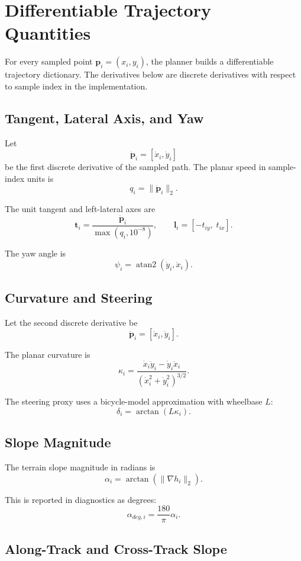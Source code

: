 \documentclass[11pt]{article}
\begin{document}
\section{Differentiable Trajectory Quantities}

For every sampled point \(\mathbf{p}_i=(x_i,y_i)\), the planner builds a differentiable trajectory dictionary. The derivatives below are discrete derivatives with respect to sample index in the implementation.

\subsection{Tangent, Lateral Axis, and Yaw}

Let
\[
  \dot{\mathbf{p}}_i = [\dot{x}_i,\dot{y}_i]
\]
be the first discrete derivative of the sampled path. The planar speed in sample-index units is
\[
  q_i = \|\dot{\mathbf{p}}_i\|_2.
\]

The unit tangent and left-lateral axes are
\[
  \mathbf{t}_i = \frac{\dot{\mathbf{p}}_i}{\max(q_i,10^{-8})},
  \qquad
  \mathbf{l}_i = [-t_{iy},\;t_{ix}].
\]

The yaw angle is
\[
  \psi_i = \operatorname{atan2}(\dot{y}_i,\dot{x}_i).
\]

\subsection{Curvature and Steering}

Let the second discrete derivative be
\[
  \ddot{\mathbf{p}}_i = [\ddot{x}_i,\ddot{y}_i].
\]

The planar curvature is
\[
  \kappa_i =
  \frac{\dot{x}_i\ddot{y}_i - \dot{y}_i\ddot{x}_i}
       {(\dot{x}_i^2+\dot{y}_i^2)^{3/2}}.
\]

The steering proxy uses a bicycle-model approximation with wheelbase \(L\):
\[
  \delta_i = \arctan(L\kappa_i).
\]

\subsection{Slope Magnitude}

The terrain slope magnitude in radians is
\[
  \alpha_i = \arctan(\|\nabla h_i\|_2).
\]

This is reported in diagnostics as degrees:
\[
  \alpha_{deg,i} = \frac{180}{\pi}\alpha_i.
\]

\subsection{Along-Track and Cross-Track Slope}
\end{document}
